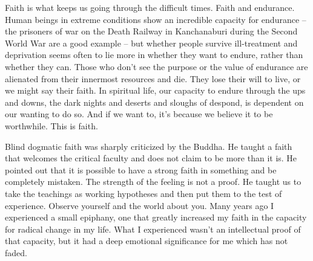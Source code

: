 Faith is what keeps us going through the difficult times. Faith and
endurance. Human beings in extreme conditions show an incredible
capacity for endurance -- the prisoners of war on the Death Railway in
Kanchanaburi during the Second World War are a good example -- but
whether people survive ill-treatment and deprivation seems often to lie
more in whether they want to endure, rather than whether they can. Those
who don't see the purpose or the value of endurance are alienated from
their innermost resources and die. They lose their will to live, or we
might say their faith. In spiritual life, our capacity to endure through
the ups and downs, the dark nights and deserts and sloughs of despond, 
is dependent on our wanting to do so. And if we want to, it's because we
believe it to be worthwhile. This is faith. 

Blind dogmatic faith was sharply criticized by the Buddha. He taught a
faith that welcomes the critical faculty and does not claim to be more
than it is. He pointed out that it is possible to have a strong faith in
something and be completely mistaken. The strength of the feeling is not
a proof. He taught us to take the teachings as working hypotheses and
then put them to the test of experience. Observe yourself and the world
about you. Many years ago I experienced a small epiphany, one that
greatly increased my faith in the capacity for radical change in my
life. What I experienced wasn't an intellectual proof of that capacity, 
but it had a deep emotional significance for me which has not faded. 

